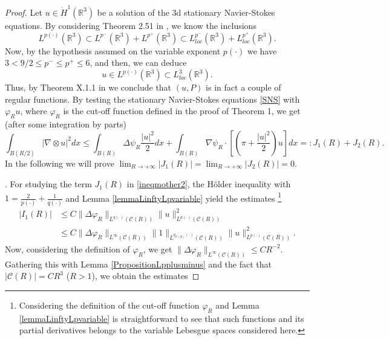 \documentclass[a4paper,12pt]{amsart}
\theoremstyle{definition}
\theoremstyle{plain}
\def\R{\mathbb{R}}
\renewcommand{\phi}{\varphi}
\let\phi\varphi
\def\R{\mathbb R}
\def\vu{ u }
\def\vn{ \nabla }
\begin{document}
\begin{proof}%
 Let  $\vu\in \dot H^1(\R^3) %
   $ be a solution of the 3d stationary Navier-Stokes equations. By considering  Theorem 2.51 in \cite{CRUZ}, we know the inclusions
$$L^{p(\cdot)}(\R^3 )\subset L^{p^-}(\R^3 )+L^{p^+}(\R^3 )
\subset L^{p^-}_{loc}(\R^3 )+L^{p^+}_{loc}(\R^3 )
.$$
Now, by the hypothesis assumed on the variable exponent $p(\cdot)$ we  have $3<9/2\leq p^-\leq p^+\leq 6 $, and  then,  we can deduce  
$$u\in L^{p(\cdot)}(\R^3 ) \subset L^3_{loc}(\R^3 ).$$
Thus, by Theorem X.1.1 in \cite{galdi2011introduction} we conclude that $(\vu,P)$ is in fact a couple of regular functions. By testing the stationary Navier-Stokes equations \eqref{SNS} with $\phi_R \vu$, where $\phi_R $ is the cut-off function defined in the proof of Theorem 1, we get (after some integration by parts)
\begin{equation}\label{ineqmother2}
\int_{B(R/2)}|\vn \otimes \vu|^2 dx 
 \leq  
\int_{B(R)} \Delta \psi_R \frac{|\vu|^2}{2} dx+ \int_{B(R)} \vn \psi_R \cdot\left[\left(\pi+\frac{|\vu|^2}{2}\right) \vu\right]dx 
=: 
J_1(R)+J_2(R)
. 
\end{equation}
In  the following we will prove 
$ \lim_{R\to +\infty}  |J_1(R)|=\lim_{R\to +\infty}  |J_2(R)|=0$.

.
 For studying the term $J_1(R)$ in \eqref{ineqmother2}, the H\"older inequality with 
$%
1=\frac{2}{p(\cdot)}+\frac{1}{q(\cdot)}
$ and Lemma \ref{lemmaLinftyLpvariable}
 yield the  estimates
\footnote{Considering the definition of the cut-off function  $\phi_R$   and Lemma  \ref{lemmaLinftyLpvariable} is straightforward to see that such functions and its partial derivatives belongs to the variable Lebesgue spaces considered here.} 
\begin{align}\label{18aveq32_T1_92_exterior_bola}
|I_1(R)|
&\leq
C\|\Delta \phi_R \|_{L^{q(\cdot)}( \mathcal{C}( R)  )}
\|\vu\|_{L^{p(\cdot)}( \mathcal{C}( R)  )}^2
\\
&\leq 
C
\|\Delta \phi_R  \|_{L^{\infty}  (\mathcal{C}( R)  )}\|1\|_{L^{q_{\mathcal{C}( R)  }(\cdot)}(\mathcal{C}( R)  )}
\|\vu\|_{L^{p(\cdot)}( \mathcal{C}( R)  )}^2
.
\end{align}
Now, considering  the definition of  $\phi_R$,  we get 
$
\|\Delta \phi_R  \|_{L^{\infty}
( \mathcal{C}( R)   )
}\leq CR^{-2}$.
Gathering this  with Lemma \ref{PropositionLpplusminus}
and the fact that
$|
\mathcal{C}( R)  
|=CR^3$  ($R>1$), we obtain the estimates 


\end{proof}
\end{document}
